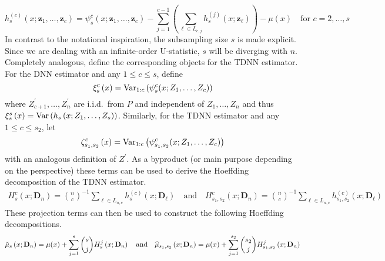 \begin{equation}
	h_{s}^{(c)}\left(x; \mathbf{z}_{1}, \dotsc, \mathbf{z}_{c}\right)
	= \psi_{s}^{c}(x; \mathbf{z}_{1}, \dotsc, \mathbf{z}_{c}) - \sum_{j = 1}^{c-1}\left(\sum_{\ell \in L_{c,j}}h_{s}^{(j)}(x; \mathbf{z}_{\ell})\right) - \mu(x)
	\quad \text{for } c = 2, \dotsc, s
\end{equation}
In contrast to the notational inspiration, the subsampling size $s$ is made explicit.
Since we are dealing with an infinite-order U-statistic, $s$ will be diverging with $n$.
Completely analogous, define the corresponding objects for the TDNN estimator.
For the DNN estimator and any $1 \leq c \leq s$, define
\begin{equation}\label{eq:xi_s_c}
	\xi_{s}^{c}\left(x\right)
	= \Var_{1:c}\left(\psi_{s}^{c}(x; Z_{1}, \dotsc, Z_{c})\right)
\end{equation}
where $Z_{c+1}^{\prime}, \ldots, Z_n^{\prime}$ are i.i.d.\ from $P$ and independent of $Z_1, \ldots, Z_n$ and thus
$\xi_{s}^{s}\left(x\right) = \Var\left(h_s\left(x; Z_1, \ldots, Z_s\right)\right)$.
Similarly, for the TDNN estimator and any $1 \leq c \leq s_2$, let
\begin{equation}\label{eq:zeta_s1s2_c}
	\zeta_{s_1, s_2}^{c}\left(x\right)
	= \Var_{1:c}\left(\psi_{s_1, s_2}^{c}(x; Z_{1}, \dotsc, Z_{c})\right)
\end{equation}
with an analogous definition of $Z^{\prime}$.
As a byproduct (or main purpose depending on the perspective) these terms can be used to derive the Hoeffding decomposition of the TDNN estimator.
\begin{equation}\label{eq:H_projection}
	\begin{aligned}
		H_{s}^{c}\left(x; \mathbf{D}_n\right)
		= \binom{n}{c}^{-1} \sum_{\ell \in L_{n,c}} h^{(c)}_{s}(x; \mathbf{D}_{\ell})
		\quad \text{and} \quad
		H_{s_1, s_2}^{c}\left(x; \mathbf{D}_n\right)
		= \binom{n}{c}^{-1} \sum_{\ell \in L_{n,c}} h^{(c)}_{s_1, s_2}(x; \mathbf{D}_{\ell})
	\end{aligned}
\end{equation}
These projection terms can then be used to construct the following Hoeffding decompositions.
\begin{equation}\label{eq:H_Decomp}
	\tilde{\mu}_{s}\left(x; \mathbf{D}_n\right)
	= \mu(x) + \sum_{j = 1}^{s}\binom{s}{j}H_{s}^{j}\left(x; \mathbf{D}_n\right)\\
	\quad \text{and} \quad
	\hat{\mu}_{s_1, s_2}\left(x; \mathbf{D}_n\right)
	= \mu(x) + \sum_{j = 1}^{s_2}\binom{s_2}{j}H_{s_1, s_2}^{j}\left(x; \mathbf{D}_n\right)
\end{equation}

